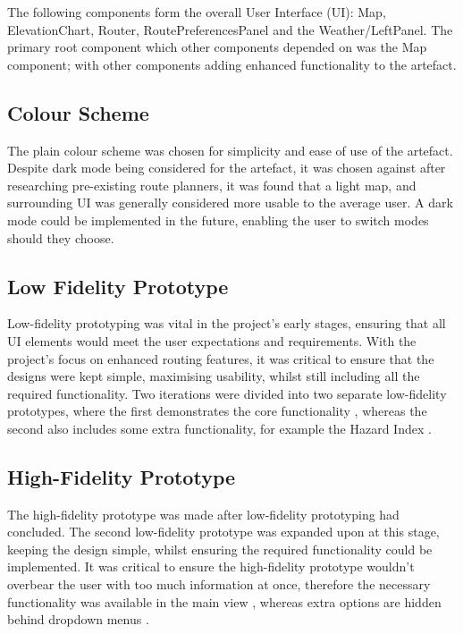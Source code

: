 The following components form the overall User Interface (UI): Map,  ElevationChart, Router, RoutePreferencesPanel and the Weather/LeftPanel. The primary root component which other components depended on was the Map component; with other components adding enhanced functionality to the artefact.

\subsection{Colour Scheme}
\label{ui:colourscheme}

The plain colour scheme was chosen for simplicity and ease of use of the artefact. Despite dark mode being considered for the artefact, it was chosen against after researching pre-existing route planners, it was found that a light map, and surrounding UI was generally considered more usable to the average user. A dark mode could be implemented in the future, enabling the user to switch modes should they choose.

\subsection{Low Fidelity Prototype}
\label{ui:low-fi}

Low-fidelity prototyping was vital in the project's early stages, ensuring that all UI elements would meet the user expectations and requirements. With the project's focus on enhanced routing features, it was critical to ensure that the designs were kept simple, maximising usability, whilst still including all the required functionality. Two iterations were divided into two separate low-fidelity prototypes, where the first demonstrates the core functionality , whereas the second also includes some extra functionality, for example the Hazard Index .

\subsection{High-Fidelity Prototype}
\label{ui:hi-fi}

The high-fidelity prototype was made after low-fidelity prototyping had concluded. The second low-fidelity prototype was expanded upon at this stage, keeping the design simple, whilst ensuring the required functionality could be implemented. It was critical to ensure the high-fidelity prototype wouldn't overbear the user with too much information at once, therefore the necessary functionality was available in the main view , whereas extra options are hidden behind dropdown menus .

